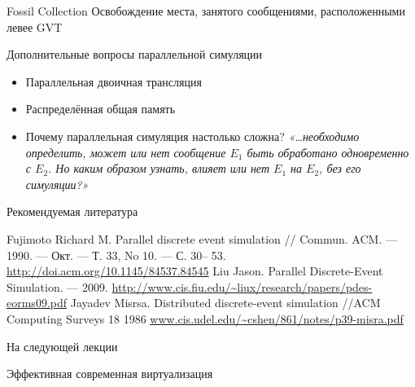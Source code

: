 \documentclass{beamer}
\begin{document}
\begin{frame}{Fossil Collection}
Освобождение места, занятого сообщениями, расположенными левее GVT
\end{frame}

\begin{frame}{Дополнительные вопросы параллельной симуляции}
\begin{itemize}
    \item Параллельная двоичная трансляция
    \item Распределённая общая память \pause
    \item Почему параллельная симуляция настолько сложна? \pause \textit{«\dots необходимо определить, может или нет сообщение $E_1$ быть обработано одновременно с $E_2$. Но каким образом узнать, влияет или нет $E_1$ на $E_2$, без его симуляции?»}
\end{itemize}    
\end{frame}



% 

\begin{frame}[allowframebreaks]{Рекомендуемая литература}
\begin{thebibliography}{99}
 Fujimoto Richard M. Parallel discrete event simulation // Commun. ACM. — 1990. — Окт. — Т. 33, No 10. — С. 30– 53. \url{http://doi.acm.org/10.1145/84537.84545}
 Liu Jason. Parallel Discrete-Event Simulation. — 2009. \url{http://www.cis.fiu.edu/~liux/research/papers/pdes-eorms09.pdf}
Jayadev Misrsa. Distributed discrete-event simulation //ACM Computing Surveys 18 1986 \url{www.cis.udel.edu/~cshen/861/notes/p39-misra.pdf}


\end{thebibliography}
\end{frame}


\begin{frame}{На следующей лекции}
\centering

Эффективная современная виртуализация

\end{frame}
\end{document}
